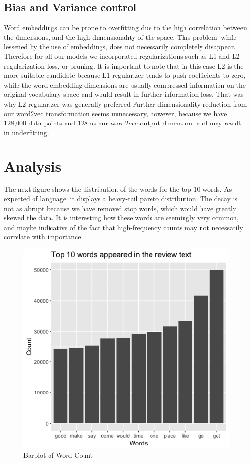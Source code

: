 \documentclass[letterpaper, 12 pt, conference]{ieeeconf}  %
\begin{document}
\subsection{Bias and Variance control}
Word embeddings can be prone to overfitting due to the high correlation between the dimensions, and the high dimensionality of the space. This problem, while lessened by the use of embeddings, does not necessarily completely disappear. Therefore for all our models we incorporated regularizations such as L1 and L2 regularization loss, or pruning. It is important to note that in this case L2 is the more suitable candidate because L1 regularizer tends to push coefficients to zero, while the word embedding dimensions are usually compressed information on the original vocabulary space and would result in further information loss. That was why L2 regularizer was generally preferred Further dimensionality reduction from our word2vec transformation seems unnecessary, however, because we have 128,000 data points and 128 as our word2vec output dimension. and may result in underfitting. 

\section{Analysis}

The next figure shows the distribution of the words for the top 10 words. As expected of language, it displays a heavy-tail pareto distribution. The decay is not as abrupt because we have removed stop words, which would have greatly skewed the data. It is interesting how these words are seemingly very common, and maybe indicative of the fact that high-frequency counts may not necessarily correlate with importance.
\begin{figure}[h]
	\centering
	\includegraphics[scale=0.53]{word_count.png}
	\caption{Barplot of Word Count}
    \label{word_count}
\end{figure}
\end{document}

